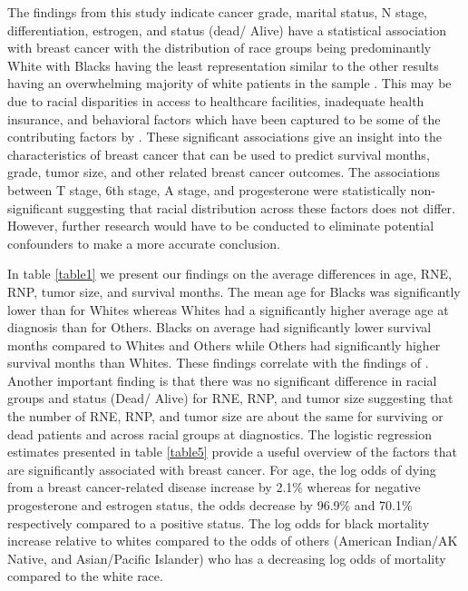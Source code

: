 \documentclass[times,sort&compress,3p]{elsarticle}
\theoremstyle{plain}
\theoremstyle{definition}
\begin{document}
The findings from this study indicate cancer grade, marital status, N stage, differentiation, estrogen, and status (dead/ Alive) have a statistical association with breast cancer with the distribution of race groups being predominantly White with Blacks having the least representation similar to the other results having an overwhelming majority of white patients in the sample \cite{stapleton2018raceethnicity}. This may be due to racial disparities in access to healthcare facilities, inadequate health insurance, and behavioral factors which have been captured to be some of the contributing factors by \cite{arciero2017africanamerican, williams2017disparities}. These significant associations give an insight into the characteristics of breast cancer that can be used to predict survival months, grade, tumor size, and other related breast cancer outcomes. The associations between T stage, 6th stage, A stage, and progesterone were statistically non-significant suggesting that racial distribution across these factors does not differ. However, further research would have to be conducted to eliminate potential confounders to make a more accurate conclusion.
 
In table \ref{table1} we present our findings on the average differences in age, RNE, RNP, tumor size, and survival months. The mean age for Blacks was significantly lower than for Whites whereas Whites had a significantly higher average age at diagnosis than for Others. Blacks on average had significantly lower survival months compared to Whites and Others while Others had significantly higher survival months than Whites. These findings correlate with the findings of \cite{hendrick2021agedistributions}. Another important finding is that there was no significant difference in racial groups and status (Dead/ Alive) for RNE, RNP, and tumor size suggesting that the number of RNE, RNP, and tumor size are about the same for surviving or dead patients and across racial groups at diagnostics.
The logistic regression estimates presented in table \ref{table5} provide a useful overview of the factors that are significantly associated with breast cancer. For age, the log odds of dying from a breast cancer-related disease increase by 2.1\% whereas for negative progesterone and estrogen status, the odds decrease by 96.9\% and 70.1\% respectively compared to a positive status. The log odds for black mortality increase relative to whites compared to the odds of others (American Indian/AK Native, and Asian/Pacific Islander) who has a decreasing log odds of mortality compared to the white race.
\end{document}
